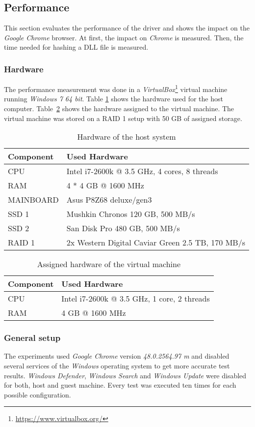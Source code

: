 \subsection{Performance}
\label{sec:performance}
This section evaluates the performance of the driver and shows the impact on the \emph{Google Chrome} browser. At first, the impact on \emph{Chrome} is measured. Then, the time needed for hashing a \gls{DLL} file is measured.

\subsubsection{Hardware}
The performance measurement was done in a \emph{VirtualBox}\footnote{\url{https://www.virtualbox.org/}} virtual machine running \emph{Windows 7 64 bit}. Table \ref{fig:hardware_host} shows the hardware used for the host computer. Table~\ref{fig:hardware_vm} shows the hardware assigned to the virtual machine. The virtual machine was stored on a RAID 1 setup with 50 GB of assigned storage. 
\begin{table}
\centering
\begin{tabularx}{\textwidth}{|l|X|}
\hline
Component & Used Hardware \\ \hline
CPU & Intel i7-2600k @ 3.5 GHz, 4 cores, 8 threads \\ \hline
RAM & 4 * 4 GB @ 1600 MHz \\ \hline
MAINBOARD & Asus P8Z68 deluxe/gen3 \\ \hline
SSD 1 & Mushkin Chronos 120 GB, 500 MB/s \\ \hline
SSD 2 & San Disk Pro 480 GB, 500 MB/s \\ \hline
RAID 1 & 2x Western Digital Caviar Green 2.5 TB, 170 MB/s \\ \hline
\end{tabularx}
\caption{Hardware of the host system}
\label{fig:hardware_host}
\end{table}
\begin{table}
\centering
\begin{tabularx}{\textwidth}{|l|X|}
\hline
Component & Used Hardware \\ \hline
CPU & Intel i7-2600k @ 3.5 GHz, 1 core, 2 threads \\ \hline
RAM & 4 GB @ 1600 MHz \\ \hline
\end{tabularx}
\caption{Assigned hardware of the virtual machine}
\label{fig:hardware_vm}
\end{table}

\subsubsection{General setup}
The experiments used \emph{Google Chrome} version \emph{48.0.2564.97 m} and disabled several services of the \emph{Windows} operating system to get more accurate test results. \emph{Windows Defender}, \emph{Windows Search} and \emph{Windows Update} were disabled for both, host and guest machine. Every test was executed ten times for each possible configuration.


\clearpage

\clearpage
